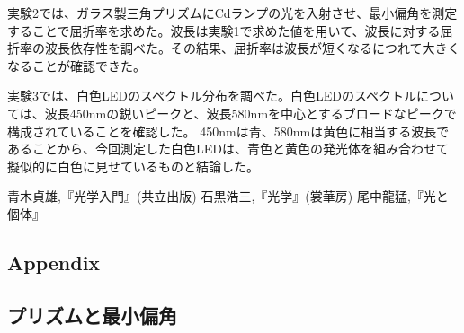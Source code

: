\documentclass[a4paper,10pt]{jsarticle}
\begin{document}
\begin{multicols}{2}
  実験2では、ガラス製三角プリズムにCdランプの光を入射させ、最小偏角を測定することで屈折率を求めた。波長は実験1で求めた値を用いて、波長に対する屈折率の波長依存性を調べた。その結果、屈折率は波長が短くなるにつれて大きくなることが確認できた。
  
  実験3では、白色LEDのスペクトル分布を調べた。白色LEDのスペクトルについては、波長450nmの鋭いピークと、波長580nmを中心とするブロードなピークで構成されていることを確認した。
  450nmは青、580nmは黄色に相当する波長であることから、今回測定した白色LEDは、青色と黄色の発光体を組み合わせて擬似的に白色に見せているものと結論した。

\begin{thebibliography}{文献数}
 青木貞雄,『光学入門』(共立出版)
 石黒浩三,『光学』(裳華房) 
 尾中龍猛,『光と個体』


\end{thebibliography}
\end{multicols}
\clearpage
\begin{center}
\section*{Appendix}
\end{center}
\subsection*{プリズムと最小偏角}
\end{document}
